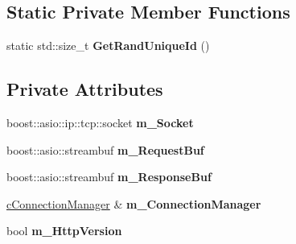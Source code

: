 \subsection*{Static Private Member Functions}
\begin{DoxyCompactItemize}
\item 
\hypertarget{classhttp__server_1_1cHttpConnection_a7afc678c519a73cffbe36a7e9009c582}{static std\-::size\-\_\-t {\bfseries Get\-Rand\-Unique\-Id} ()}\label{classhttp__server_1_1cHttpConnection_a7afc678c519a73cffbe36a7e9009c582}

\end{DoxyCompactItemize}
\subsection*{Private Attributes}
\begin{DoxyCompactItemize}
\item 
\hypertarget{classhttp__server_1_1cHttpConnection_acf6b64550b0e0f8287d7b55a5613ef0f}{boost\-::asio\-::ip\-::tcp\-::socket {\bfseries m\-\_\-\-Socket}}\label{classhttp__server_1_1cHttpConnection_acf6b64550b0e0f8287d7b55a5613ef0f}

\item 
\hypertarget{classhttp__server_1_1cHttpConnection_a0504245e3903f238ff13145a832d4582}{boost\-::asio\-::streambuf {\bfseries m\-\_\-\-Request\-Buf}}\label{classhttp__server_1_1cHttpConnection_a0504245e3903f238ff13145a832d4582}

\item 
\hypertarget{classhttp__server_1_1cHttpConnection_a6f99bd0fa66b31461010ef0948fa428f}{boost\-::asio\-::streambuf {\bfseries m\-\_\-\-Response\-Buf}}\label{classhttp__server_1_1cHttpConnection_a6f99bd0fa66b31461010ef0948fa428f}

\item 
\hypertarget{classhttp__server_1_1cHttpConnection_adea2cf9ab3ff28fd70c9a910ef9bfda3}{\hyperlink{classhttp__server_1_1cConnectionManager}{c\-Connection\-Manager} \& {\bfseries m\-\_\-\-Connection\-Manager}}\label{classhttp__server_1_1cHttpConnection_adea2cf9ab3ff28fd70c9a910ef9bfda3}

\item 
\hypertarget{classhttp__server_1_1cHttpConnection_a785dff3fa5be6e114762738aae4d031e}{bool {\bfseries m\-\_\-\-Http\-Version}}\label{classhttp__server_1_1cHttpConnection_a785dff3fa5be6e114762738aae4d031e}

\end{DoxyCompactItemize}
